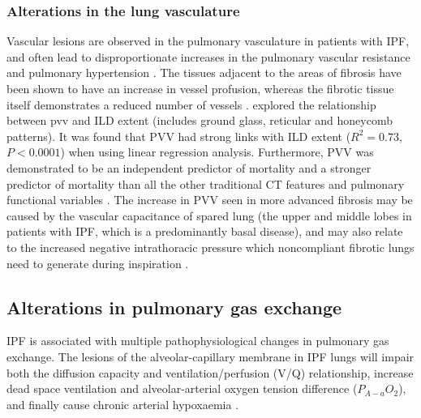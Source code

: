 \subsubsection{Alterations in the lung vasculature} \label{VasculatureAlterations}
Vascular lesions are observed in the pulmonary vasculature in patients with IPF, and often lead to disproportionate increases in the pulmonary vascular resistance and pulmonary hypertension \citep{plantier2018physiology}. The tissues adjacent to the areas of fibrosis have been shown to have an increase in vessel profusion, whereas the fibrotic tissue itself demonstrates a reduced number of vessels \citep{cosgrove2004pigment,ebina2004heterogeneous}. \cite{Jacob2016Evaluation} explored the relationship between \gls{pvv} and ILD extent (includes ground glass, reticular and honeycomb patterns). It was found that PVV had strong links with ILD extent ($R^2 = 0.73$, $P < 0.0001$) when using linear regression analysis. Furthermore, PVV was demonstrated to be an independent predictor of mortality and a stronger predictor of mortality than all the other traditional CT features and pulmonary functional variables \citep{Jacob2016Evaluation}. The increase in PVV seen in more advanced fibrosis may be caused by the vascular capacitance of spared lung (the upper and middle lobes in patients with IPF, which is a predominantly basal disease), and may also relate to the increased negative intrathoracic pressure which noncompliant fibrotic lungs need to generate during inspiration \citep{Jacob2016Mortality}.

\subsection{Alterations in pulmonary gas exchange}
IPF is associated with multiple pathophysiological changes in pulmonary gas exchange. The lesions of the alveolar-capillary membrane in IPF lungs will impair both the diffusion capacity and ventilation/perfusion (V/Q) relationship, increase dead space ventilation and alveolar-arterial oxygen tension difference ($P_{A-a}O_2$), and finally cause chronic arterial hypoxaemia \citep{crystal1976idiopathic,plantier2018physiology,american2000idiopathic}.

